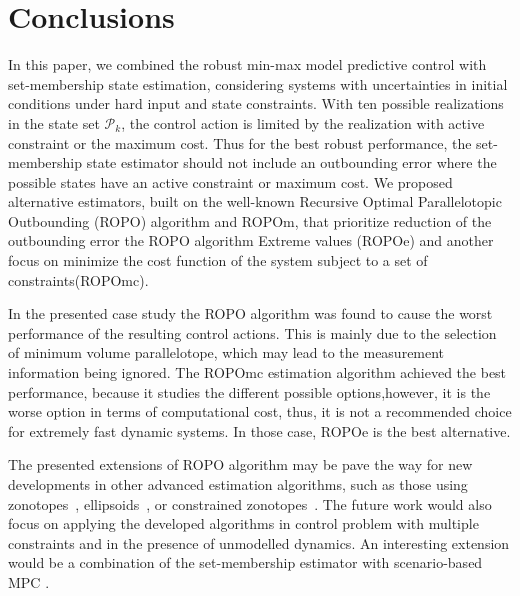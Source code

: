 \documentclass{ifacconf}
\newcommand{\wrt}{\text{w.r.t. }}
\begin{document}
\section{Conclusions}\label{sec:conclu}
In this paper, we combined the robust min-max model predictive control with set-membership state estimation, considering systems with uncertainties in initial conditions under hard input and state constraints. With ten possible realizations in the state set $\mathcal{P}_{k}$, the control action is limited by the realization with active constraint or the maximum cost. Thus for the best robust performance, the set-membership state estimator should not include an outbounding error where the possible states have an active constraint or maximum cost. We proposed alternative estimators, built on the well-known Recursive Optimal Parallelotopic Outbounding (ROPO) algorithm and ROPOm, that prioritize reduction of the outbounding error \wrt the ROPO algorithm Extreme values (ROPOe) and another focus on minimize the cost function of the system subject to a set of constraints(ROPOmc).

In the presented case study the ROPO algorithm was found to cause the worst performance of the resulting control actions. This is mainly due to the selection of minimum volume parallelotope, which may lead to the measurement information being ignored. The ROPOmc estimation algorithm achieved the best performance, because it studies the different possible options,however, it is the worse option in terms of computational cost, thus, it is not a recommended choice for extremely fast dynamic systems. In those case, ROPOe is the best alternative.

The presented extensions of ROPO algorithm may be pave the way for new developments in other advanced estimation algorithms, such as those using zonotopes~\citep{le13book}, ellipsoids~\citep{Filippova1996}, or constrained zonotopes~\citep{Scott2016}. The future work would also focus on applying the developed algorithms in control problem with multiple constraints and in the presence of unmodelled dynamics. An interesting extension would be a combination of the set-membership estimator with scenario-based MPC \citep{ber09}.

\end{document}
